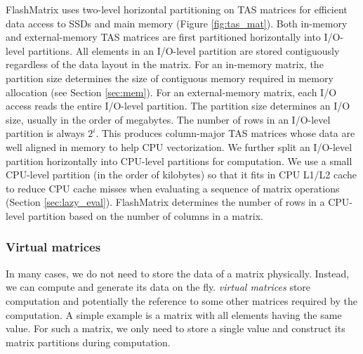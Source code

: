 FlashMatrix uses two-level horizontal partitioning on TAS matrices for efficient
data access to SSDs and main memory (Figure \ref{fig:tas_mat}). Both in-memory
and external-memory TAS matrices are first partitioned horizontally into
I/O-level partitions. All elements in an I/O-level partition are stored
contiguously regardless of the data layout in the matrix. For an in-memory matrix,
the partition size determines the size of contiguous memory required in memory
allocation (see Section \ref{sec:mem}). For an external-memory matrix, each I/O
access reads the entire I/O-level partition. The partition size determines an I/O
size, usually in the order of megabytes. The number of rows in an I/O-level
partition is always $2^i$. This produces column-major TAS matrices whose data
are well aligned in memory to help CPU vectorization.
We further split an I/O-level partition
horizontally into CPU-level partitions for computation. We use a small
CPU-level partition (in the order of kilobytes) so that it fits in CPU L1/L2
cache to reduce CPU cache misses when evaluating a sequence of matrix
operations (Section \ref{sec:lazy_eval}). FlashMatrix determines the number
of rows in a CPU-level partition based on the number of columns in a matrix.


\subsubsection{Virtual matrices} \label{virt_mat}
In many cases, we do not need to store the data of a matrix physically. Instead,
we can compute and generate its data on the fly. \textit{virtual matrices} store
computation and potentially the reference
to some other matrices required by the computation. A simple example is a matrix
with all elements having the same value. For such a matrix, we only need to store
a single value and construct its matrix partitions during computation.

